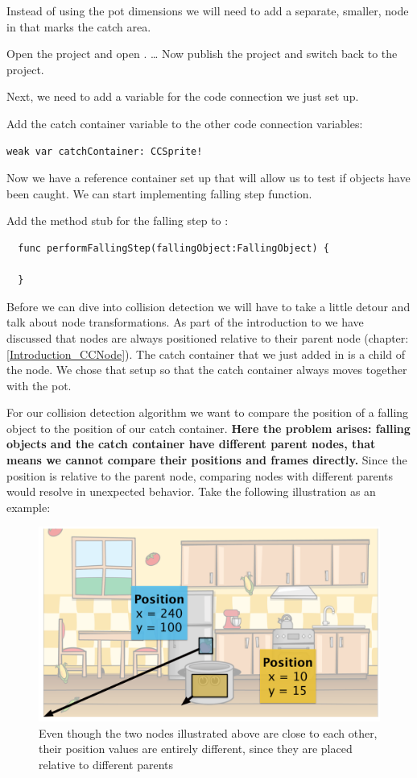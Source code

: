 Instead of using the pot dimensions we will need to add a separate, smaller,
node in \SB{} that marks the catch area. 
\begin{leftbar}
Open the \SB{} project and open .
\ldots
Now publish the \SB{} project and switch back to the \xcode{} project.
\end{leftbar}
Next, we need to add a variable for the code connection we just set up.
\begin{leftbar}
Add the catch container variable to the other code connection variables:
\begin{lstlisting}
weak var catchContainer: CCSprite!
\end{lstlisting}
\end{leftbar}
Now we have a reference container set up that will allow us to test if objects
have been caught. We can start implementing falling step function.
\begin{leftbar}
Add the method stub for the falling step to :
\begin{lstlisting}
  func performFallingStep(fallingObject:FallingObject) {

  }
\end{lstlisting}
\end{leftbar}
Before we can dive into collision detection we will have to take a little detour
and talk about node transformations. As part of the
introduction to \cocos{} we have discussed that nodes are always positioned
relative to their parent node (chapter: \ref{Introduction_CCNode}). The catch
container that we just added in \SB{} is a child of the 
node. We chose that setup so that the catch container always moves together
with the pot. 

For our collision detection algorithm we want to compare the position of a
falling object to the position of our catch container. \textbf{Here the problem
arises: falling objects and the catch container have different parent nodes,
that means we cannot compare their positions and frames directly.} Since the
position is relative to the parent node, comparing nodes with different parents
would resolve in unexpected behavior. Take the following illustration as an
example:
\begin{figure}[H]
		\centering
		\includegraphics[width=0.7\linewidth]{images/Chapter3/parent_transform.png}
		\caption{Even though the two nodes illustrated above are close to each other,
		their position values are entirely different, since they are placed relative
		to different parents}
\end{figure}
\label{Introduction_CCNode}
